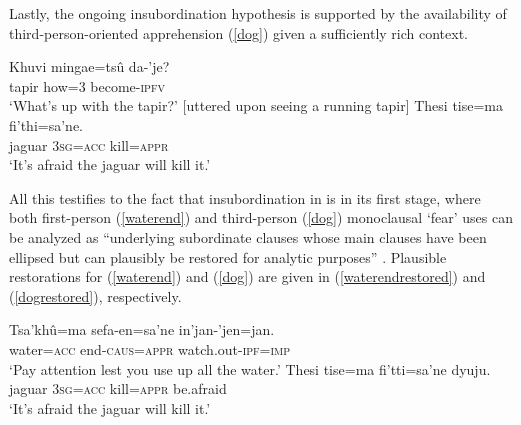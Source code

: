 \documentclass[output=paper,colorlinks,citecolor=brown]{langscibook}
\begin{document}
Lastly, the ongoing insubordination hypothesis is supported by the availability of third-person-oriented apprehension (\ref{dog}) given a sufficiently rich context.
\begin{exe} 
    \ex \label{dog} \begin{xlist}
     \gll Khuvi mingae=tsû da-'je?   \\
             tapir how\textsc{=}3 become-\textsc{ipfv}  \\
        \glt `What's up with the tapir?' [uttered upon seeing a running tapir]
     \gll {\ob}Thesi tise=ma fi'thi=sa'ne.{\cb}   \\
             jaguar \textsc{3sg=acc} kill=\textsc{appr}   \\
        \glt `It's afraid the jaguar will kill it.' 
    \end{xlist}
\end{exe}

All this testifies to the fact that insubordination in  is in its first stage, where both first-person (\ref{waterend}) and third-person (\ref{dog}) monoclausal `fear' uses can be analyzed as ``underlying subordinate clauses whose main clauses have been ellipsed but can plausibly be restored for analytic purposes'' \citep[430]{evans2007insubordination}. Plausible restorations for (\ref{waterend}) and (\ref{dog}) are given in (\ref{waterendrestored}) and (\ref{dogrestored}), respectively.
\begin{exe}
    \ex \label{waterendrestored}
    \gll {\ob}Tsa'khû=ma {sefa-en=sa'ne{\cb}} in'jan-'jen=jan. \\
    water=\textsc{acc} {end-\textsc{caus=appr}} {watch.out-\textsc{ipf=imp}} \\
    \glt `Pay attention lest you use up all the water.'
    \ex \label{dogrestored}
    \gll {\ob}Thesi tise=ma {fi'tti=sa'ne{\cb}} dyuju.  \\
        jaguar \textsc{3sg=acc} kill=\textsc{appr} {be.afraid}  \\
    \glt `It's afraid the jaguar will kill it.' 
\end{exe}
    
\end{document}
